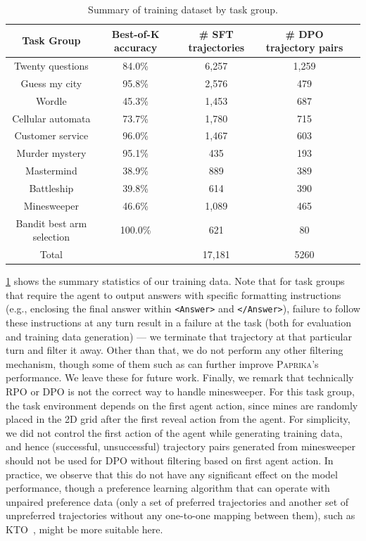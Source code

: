 \documentclass{article}
\newcommand{\ours}[1]{\textsc{Paprika}}
\theoremstyle{plain}
\theoremstyle{definition}
\theoremstyle{remark}
\begin{document}
\begin{table}[h]
    \caption{Summary of training dataset by task group. }
    \label{tab:train_dataset_summary}
    \vspace{0.3cm}
    \centering
        \begin{tabular}{c|c c c c}
        \toprule
            Task Group & Best-of-K accuracy & \# SFT trajectories & \# DPO trajectory pairs \\
            \midrule
            Twenty questions & 84.0\% & 6,257 & 1,259 \\
             Guess my city & 95.8\% & 2,576 & 479 \\
             Wordle & 45.3\% & 1,453 & 687 \\
             Cellular automata & 73.7\% & 1,780 & 715 \\
             Customer service & 96.0\% & 1,467 & 603 \\
             Murder mystery & 95.1\% & 435 & 193 \\
             Mastermind & 38.9\% & 889 & 389  \\
             Battleship & 39.8\% & 614 & 390 \\
             Minesweeper & 46.6\% & 1,089 & 465  \\
             Bandit best arm selection & 100.0\% & 621 & 80 \\
            \midrule
            Total & & 17,181 & 5260 \\
            \bottomrule
        \end{tabular}
    \vspace{-0.3cm}
\end{table}
\cref{tab:train_dataset_summary} shows the summary statistics of our training data.
Note that for task groups that require the agent to output answers with specific formatting instructions (e.g., enclosing the final answer within \texttt{<Answer>} and \texttt{</Answer>}), failure to follow these instructions at any turn result in a failure at the task (both for evaluation and training data generation) --- we terminate that trajectory at that particular turn and filter it away. Other than that, we do not perform any other filtering mechanism, though some of them such as \citet{razin2024unintentionalunalignmentlikelihooddisplacement} can further improve \ours{}'s performance. We leave these for future work.
Finally, we remark that technically RPO or DPO is not the correct way to handle minesweeper. For this task group, the task environment depends on the first agent action, since mines are randomly placed in the 2D grid after the first reveal action from the agent. For simplicity, we did not control the first action of the agent while generating training data, and hence (successful, unsuccessful) trajectory pairs generated from minesweeper should not be used for DPO without filtering based on first agent action. In practice, we observe that this do not have any significant effect on the model performance, though a preference learning algorithm that can operate with unpaired preference data (only a set of preferred trajectories and another set of unpreferred trajectories without any one-to-one mapping between them), such as KTO~\citep{ethayarajh2024ktomodelalignmentprospect}, might be more suitable here.
\newpage
\end{document}
